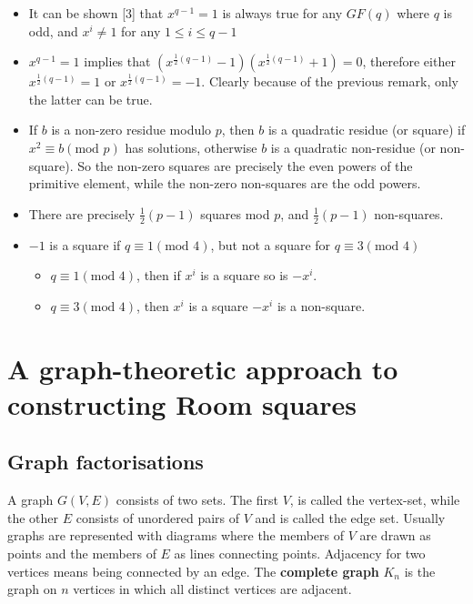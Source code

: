 \documentclass[
  12pt,
  a4paper]{book}
\begin{document}
\begin{itemize}
\item
  It can be shown {[}3{]} that \(x^{q-1}=1\) is always true for any
  \(GF(q)\) where \(q\) is odd, and \(x^i \neq 1\) for any
  \(1 \leq i \leq q-1\)
\item
  \(x^{q-1}=1\) implies that
  \((x^{\frac{1}{2}(q-1)}-1)(x^{\frac{1}{2}(q-1)}+1)=0\), therefore
  either \(x^{\frac{1}{2}(q-1)}=1\) or \(x^{\frac{1}{2}(q-1)}=-1\).
  Clearly because of the previous remark, only the latter can be true.
\item
  If \(b\) is a non-zero residue modulo \(p\), then \(b\) is a quadratic
  residue (or square) if \(x^2 \equiv b(\textrm{mod } p)\) has
  solutions, otherwise \(b\) is a quadratic non-residue (or non-square).
  So the non-zero squares are precisely the even powers of the primitive
  element, while the non-zero non-squares are the odd powers.
\item
  There are precisely \(\frac{1}{2}(p-1)\) squares mod \(p\), and
  \(\frac{1}{2}(p-1)\) non-squares.
\item
  \(-1\) is a square if \(q \equiv 1(\textrm{mod } 4)\), but not a
  square for \(q \equiv 3(\textrm{mod } 4)\)

  \begin{itemize}
  \item
    \(q \equiv 1(\textrm{mod } 4)\), then if \(x^i\) is a square so is
    \(-x^i\).
  \item
    \(q \equiv 3(\textrm{mod } 4)\), then \(x^i\) is a square \(-x^i\)
    is a non-square.
  \end{itemize}
\end{itemize}

\hypertarget{a-graph-theoretic-approach-to-constructing-room-squares}{%
\chapter{A graph-theoretic approach to constructing Room
squares}\label{a-graph-theoretic-approach-to-constructing-room-squares}}

\hypertarget{graph-factorisations}{%
\section{Graph factorisations}\label{graph-factorisations}}

A graph \(G(V,E)\) consists of two sets. The first \(V\), is called the
vertex-set, while the other \(E\) consists of unordered pairs of \(V\)
and is called the edge set. Usually graphs are represented with diagrams
where the members of \(V\) are drawn as points and the members of \(E\)
as lines connecting points. Adjacency for two vertices means being
connected by an edge. The \textbf{complete graph} \(K_n\) is the graph
on \(n\) vertices in which all distinct vertices are adjacent.
\end{document}
